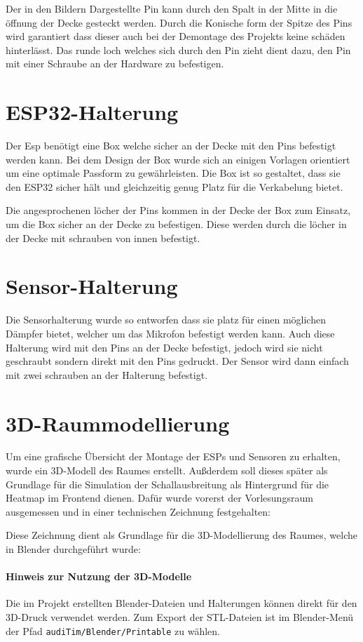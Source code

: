 Der in den Bildern Dargestellte Pin kann durch den Spalt in der Mitte in die öffnung der Decke gesteckt werden.
Durch die Konische form der Spitze des Pins wird garantiert dass dieser auch bei der Demontage des Projekts keine schäden hinterlässt.
Das runde loch welches sich durch den Pin zieht dient dazu, den Pin mit einer Schraube an der Hardware zu befestigen.

\section{ESP32-Halterung}
Der Esp benötigt eine Box welche sicher an der Decke mit den Pins befestigt werden kann.
Bei dem Design der Box wurde sich an einigen Vorlagen orientiert um eine optimale Passform zu gewährleisten.
Die Box ist so gestaltet, dass sie den ESP32 sicher hält und gleichzeitig genug Platz für die Verkabelung bietet.

\begin{center}
\end{center}

Die angesprochenen löcher der Pins kommen in der Decke der Box zum Einsatz, um die Box sicher an der Decke zu befestigen.
Diese werden durch die löcher in der Decke mit schrauben von innen befestigt.

\begin{center}
\end{center}

\section{Sensor-Halterung}

Die Sensorhalterung wurde so entworfen dass sie platz für einen möglichen Dämpfer bietet,
welcher um das Mikrofon befestigt werden kann.
Auch diese Halterung wird mit den Pins an der Decke befestigt, jedoch wird sie nicht geschraubt sondern direkt mit den Pins gedruckt.
Der Sensor wird dann einfach mit zwei schrauben an der Halterung befestigt.

\begin{center}
\end{center}

\section{3D-Raummodellierung}
Um eine grafische Übersicht der Montage der ESPs und Sensoren zu erhalten, wurde ein 3D-Modell des Raumes erstellt.
Außderdem soll dieses später als Grundlage für die Simulation der Schallausbreitung als Hintergrund für die Heatmap im Frontend dienen.
Dafür wurde vorerst der Vorlesungsraum ausgemessen und in einer technischen Zeichnung festgehalten:
\begin{center}
\end{center}
Diese Zeichnung dient als Grundlage für die 3D-Modellierung des Raumes, welche in Blender durchgeführt wurde:
\begin{center}
\end{center}

\paragraph{Hinweis zur Nutzung der 3D-Modelle}  
Die im Projekt erstellten Blender-Dateien und Halterungen können direkt für den 3D-Druck verwendet werden.  
Zum Export der STL-Dateien ist im Blender-Menü der Pfad \texttt{audiTim/Blender/Printable} zu wählen.
